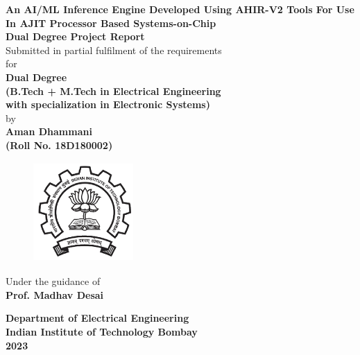 \documentclass[a4paper,12pt, final]{report}
\begin{document}
  \thispagestyle{empty}
  \vspace*{1cm}
  {\centering     
  \textbf{\LARGE An AI/ML Inference Engine Developed Using AHIR-V2 Tools For Use In AJIT Processor Based Systems-on-Chip}\\
  \vspace{1.20cm}
  \textbf{\large Dual Degree Project Report}\\
  \vspace{1cm}
  {Submitted in partial fulfilment of the requirements}\\
  \vspace{0.25cm}
  {for}\\
  \vspace{1cm}
  \textbf{ Dual Degree \\(B.Tech + M.Tech in Electrical Engineering \\with specialization in Electronic Systems)}\\
  \vspace{1.50cm}
  {by}\\
  \vspace{0.20cm}
  \textbf{\large Aman Dhammani}\\
  \vspace{0.25cm}
  \textbf{\large (Roll No. 18D180002)}\\
  \vspace{1.8cm}
    \begin{figure}[htb]
    \begin{center}
    \includegraphics[height=1.5in,width=1.5in]{iitblogo.png}
    \end{center}
    \end{figure}
  \vspace{1.450cm}
  {Under the guidance of}\\
  \vspace{0.20cm}
  \textbf{\large Prof. Madhav Desai}\\
    \vspace{0.30cm}

    
  {\textbf{Department of Electrical Engineering}}\\
  {\textbf{Indian Institute of Technology Bombay}}\\
  {\textbf{2023}}
 
 }
\end{document}
